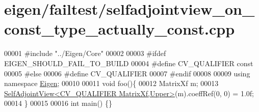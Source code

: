 \hypertarget{eigen_2failtest_2selfadjointview__on__const__type__actually__const_8cpp_source}{}\section{eigen/failtest/selfadjointview\+\_\+on\+\_\+const\+\_\+type\+\_\+actually\+\_\+const.cpp}
\label{eigen_2failtest_2selfadjointview__on__const__type__actually__const_8cpp_source}

\begin{DoxyCode}
00001 \textcolor{preprocessor}{#include "../Eigen/Core"}
00002 
00003 \textcolor{preprocessor}{#ifdef EIGEN\_SHOULD\_FAIL\_TO\_BUILD}
00004 \textcolor{preprocessor}{#define CV\_QUALIFIER const}
00005 \textcolor{preprocessor}{#else}
00006 \textcolor{preprocessor}{#define CV\_QUALIFIER}
00007 \textcolor{preprocessor}{#endif}
00008 
00009 \textcolor{keyword}{using namespace }\hyperlink{namespace_eigen}{Eigen};
00010 
00011 \textcolor{keywordtype}{void} foo()\{
00012     MatrixXf m;
00013     \hyperlink{group___core___module_class_eigen_1_1_self_adjoint_view}{SelfAdjointView<CV\_QUALIFIER MatrixXf,Upper>}(m).coeffRef(0,
       0) = 1.0f;
00014 \}
00015 
00016 \textcolor{keywordtype}{int} main() \{\}
\end{DoxyCode}
